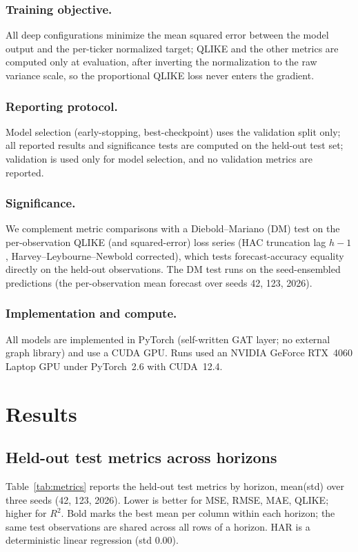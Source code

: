 \documentclass[runningheads]{llncs}
\begin{document}
\subsubsection{Training objective.}
All deep configurations minimize the mean squared error between the model output and the per-ticker
normalized target; QLIKE and the other metrics are computed only at evaluation, after inverting the
normalization to the raw variance scale, so the proportional QLIKE loss never enters the gradient.

\subsubsection{Reporting protocol.}
Model selection (early-stopping, best-checkpoint) uses the validation split only; all reported results and
significance tests are computed on the held-out test set; validation is used only for model selection, and
no validation metrics are reported.

\subsubsection{Significance.}
We complement metric comparisons with a Diebold--Mariano (DM) test on the per-observation QLIKE (and
squared-error) loss series (HAC truncation lag $h{-}1$, Harvey--Leybourne--Newbold corrected), which tests
forecast-accuracy equality directly on the held-out observations. The DM test runs on the seed-ensembled
predictions (the per-observation mean forecast over seeds 42, 123, 2026).

\subsubsection{Implementation and compute.}
All models are implemented in PyTorch (self-written GAT layer; no external graph library) and use a CUDA
GPU. Runs used an NVIDIA GeForce RTX~4060 Laptop GPU under PyTorch~2.6 with CUDA~12.4.

\section{Results}
\label{sec:results}

\subsection{Held-out test metrics across horizons}
\label{sec:results-metrics}
Table~\ref{tab:metrics} reports the held-out test metrics by horizon, mean(std) over three seeds
(42, 123, 2026). Lower is better for MSE, RMSE, MAE, QLIKE; higher for $R^2$. Bold marks the best mean per
column within each horizon; the same test observations are shared across all rows of a horizon. HAR is a
deterministic linear regression (std $0.00$).
\end{document}
